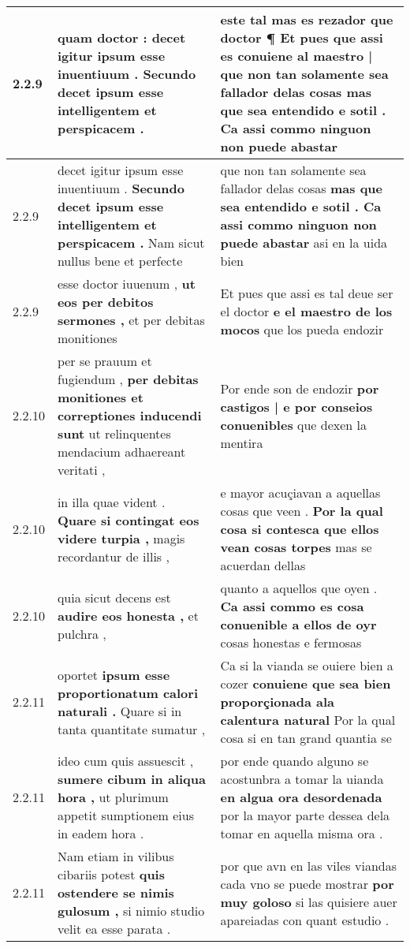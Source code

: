 \begin{tabular}{|p{1cm}|p{6.5cm}|p{6.5cm}|}
2.2.9 & quam doctor : \textbf{ decet igitur ipsum esse inuentiuum . } Secundo decet ipsum esse intelligentem et perspicacem . & este tal mas es rezador que doctor ¶ \textbf{ Et pues que assi es conuiene al maestro | que non tan solamente sea fallador delas cosas } mas que sea entendido e sotil . Ca assi commo ninguon non puede abastar \\\hline
2.2.9 & decet igitur ipsum esse inuentiuum . \textbf{ Secundo decet ipsum esse intelligentem et perspicacem . } Nam sicut nullus bene et perfecte & que non tan solamente sea fallador delas cosas \textbf{ mas que sea entendido e sotil . Ca assi commo ninguon non puede abastar } asi en la uida bien \\\hline
2.2.9 & esse doctor iuuenum , \textbf{ ut eos per debitos sermones , } et per debitas monitiones & Et pues que assi es tal deue ser el doctor \textbf{ e el maestro de los mocos } que los pueda endozir \\\hline
2.2.10 & per se prauum et fugiendum , \textbf{ per debitas monitiones et correptiones inducendi sunt } ut relinquentes mendacium adhaereant veritati , & Por ende son de endozir \textbf{ por castigos | e por conseios conuenibles } que dexen la mentira \\\hline
2.2.10 & in illa quae vident . \textbf{ Quare si contingat eos videre turpia , } magis recordantur de illis , & e mayor acuçiavan a aquellas cosas que veen . \textbf{ Por la qual cosa si contesca que ellos vean cosas torpes } mas se acuerdan dellas \\\hline
2.2.10 & quia sicut decens est \textbf{ audire eos honesta , } et pulchra , & quanto a aquellos que oyen . \textbf{ Ca assi commo es cosa conuenible a ellos de oyr } cosas honestas e fermosas \\\hline
2.2.11 & oportet \textbf{ ipsum esse proportionatum calori naturali . } Quare si in tanta quantitate sumatur , & Ca si la vianda se ouiere bien a cozer \textbf{ conuiene que sea bien proporçionada ala calentura natural } Por la qual cosa si en tan grand quantia se \\\hline
2.2.11 & ideo cum quis assuescit , \textbf{ sumere cibum in aliqua hora , } ut plurimum appetit sumptionem eius in eadem hora . & por ende quando alguno se acostunbra a tomar la uianda \textbf{ en algua ora desordenada } por la mayor parte dessea dela tomar en aquella misma ora . \\\hline
2.2.11 & Nam etiam in vilibus cibariis potest \textbf{ quis ostendere se nimis gulosum , } si nimio studio velit ea esse parata . & por que avn en las viles viandas cada vno se puede mostrar \textbf{ por muy goloso } si las quisiere auer apareiadas con quant estudio . \\\hline

\end{tabular}
